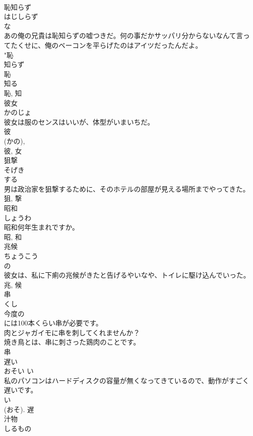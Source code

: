 \documentclass[8pt]{extreport}
\begin{document}
\begin{CJK}{UTF8}{min}
\\	恥知らず	
\\	はじしらず	
\\	な 
\\	あの俺の兄貴は恥知らずの嘘つきだ。何の事だかサッパリ分からないなんて言ってたくせに、俺のベーコンを平らげたのはアイツだったんだよ。	
\\	"恥 
\\	知らず 
\\	恥 
\\	知る 
\\	恥, 知	
\\	彼女	
\\	かのじょ	
\\	彼女は服のセンスはいいが、体型がいまいちだ。	
\\	彼 
\\	(かの), 
\\	彼, 女	
\\	狙撃	
\\	そげき	
\\	する 
\\	男は政治家を狙撃するために、そのホテルの部屋が見える場所までやってきた。	
\\	狙, 撃	
\\	昭和	
\\	しょうわ	
\\	昭和何年生まれですか。	
\\	昭, 和	
\\	兆候	
\\	ちょうこう	
\\	の 
\\	彼女は、私に下痢の兆候がきたと告げるやいなや、トイレに駆け込んでいった。	
\\	兆, 候	
\\	串	
\\	くし	
\\	今度の
\\	には100本くらい串が必要です。	
\\	肉とジャガイモに串を刺してくれませんか？	
\\	焼き鳥とは、串に刺さった鶏肉のことです。	
\\	串	
\\	遅い	
\\	おそい	い 
\\	私のパソコンはハードディスクの容量が無くなってきているので、動作がすごく遅いです。	
\\	い 
\\	(おそ).	遅	
\\	汁物	
\\	しるもの	

\end{CJK}
\end{document}

